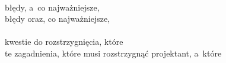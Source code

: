 \documentclass[a4paper,11pt]{article}
\numberwithin{equation}{section}
\begin{document}
\VerSpaceTwo


\noindent
{} \\
\Jest błędy, a~co najważniejsze, \\
\PowinnoByc błędy oraz, co najważniejsze, \\
 \\
\Jest kwestie do rozstrzygnięcia, które \\
\PowinnoByc te zagadnienia, które musi rozstrzygnąć projektant, a~które \\












\printbibliography





\end{document}
